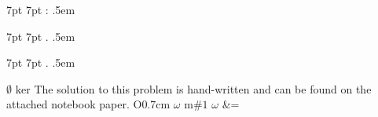 \usepackage{amsmath}
\usepackage{amssymb}
\usepackage{amsthm}
\usepackage{bm}
\usepackage{enumitem}
\usepackage{float}
\usepackage{graphicx}
\usepackage{mathrsfs}  %
\usepackage{mathtools}
\usepackage{parskip}
\usepackage{xparse}

\graphicspath{ {./img/} }


\newtheorem{theorem}{Theorem}[section]
\newtheorem{corollary}{Corollary}[theorem]
\newtheorem{lemma}{Lemma}

%
   {7pt}%
   {7pt}%
   {}%
   {}%
   {\bfseries}%
   {:}%
   {.5em}%
   {}

%
   {7pt}%
   {7pt}%
   {}%
   {}%
   {\bfseries}%
   {.}%
   {.5em}%
   {}

%
   {7pt}%
   {7pt}%
   {}%
   {}%
   {\itshape}%
   {.}%
   {.5em}%
   {}

\theoremstyle{case}
\newtheorem{case}{Case}

\theoremstyle{claim}
\newtheorem*{claim}{Claim}

\theoremstyle{remark}
\newtheorem*{remark}{Remark}

\makeatletter
\newcommand*{\declarecommand}{%
    \@star@or@long\declare@command
}
\newcommand*{\declare@command}[1]{%
    \provide@command{#1}{}%
    \RenewDocumentCommand{#1}%
}
\makeatother

\renewcommand{\a}{\alpha}
\newcommand{\Bythrm}[1]{By Theorem #1 of the text}
\renewcommand{\b}{\beta}
\newcommand{\bythrm}[1]{by Theorem #1 of the text}
\newcommand{\C}{\mathbb{C}}
\newcommand{\cC}{\mathcal{C}}
\newcommand{\cN}{\mathcal{N}}
\newcommand{\cR}{\mathcal{R}}
\newcommand{\cQ}{\mathcal{Q}}
\newcommand{\cZ}{\mathcal{Z}}
\renewcommand{\cal}[1]{\mathcal{#1}}
\newcommand{\com}[1]{\text{\scriptsize(#1)}}
\renewcommand{\d}{\delta}
\newcommand{\e}{\ensuremath{\epsilon}}
\declarecommand{\es}{}{\ensuremath{\emptyset}}
\newcommand{\h}[1]{\ensuremath{\hat{#1}}}
\renewcommand{\l}{\ell}
\declarecommand{\ker}{}{\ensuremath{\text{ker}}}
\newcommand{\la}{\leftarrow}
\newcommand{\N}{\mathbb{N}}
\declarecommand{\nb}{}{The solution to this problem is hand-written and can be found on the attached notebook paper.}
\declarecommand{\novs}{O{0.7cm}}{\vspace{-#1}}
\newcommand\numberthis{\addtocounter{equation}{1}\tag{\theequation}}
\declarecommand{\o}{}{\ensuremath{\omega}}
\newcommand{\R}{\mathbb{R}}
\newcommand{\ra}{\rightarrow}
\newcommand{\s}[1]{\ensuremath{\{#1\}}}
\newcommand{\set}[1]{\ensuremath{\{#1\}}}
\newcommand{\seq}[1]{\left\{#1\right\}_{n=1}^{\infty}}
\newcommand{\struct}[1]{\langle #1 \rangle}
\newcommand{\st}[1]{\ensuremath{\langle #1 \rangle}}
\newcommand{\sub}{\ensuremath{\subset}}
\newcommand{\sube}{\ensuremath{\subseteq}}
\renewcommand{\t}{\theta}
\declarecommand{\tx}{m}{\ensuremath{\text{#1}}}
\newcommand{\vphi}{\varphi}
\declarecommand{\w}{}{\ensuremath{\omega}}
\newcommand{\Q}{\mathbb{Q}}
\newcommand{\Z}{\mathbb{Z}}
\declarecommand{\=}{}{&=}
